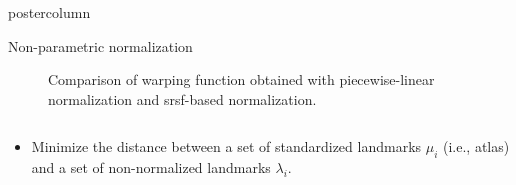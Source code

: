 \documentclass[final, size=a0]{beamer}
\begin{document}
\begin{frame}
\begin{columns}
\begin{column}{.33\textwidth}
\begin{beamercolorbox}[center,wd=\textwidth]{postercolumn}
\begin{minipage}[T]{.95\textwidth}
{\begin{alertblock}{Non-parametric normalization}
              \begin{figure}
                \centering
                \hfill
                \hfill
                \caption{Comparison of warping function obtained with \protect{} piecewise-linear normalization and \protect{} \acs{srsf}-based normalization.}
                \label{fig:non-parametric}
              \end{figure}
              
              \begin{columns}
                \begin{column}{.5\textwidth}
                  \begin{itemize}
                  \justifying
                  \item Minimize the distance between a set of standardized landmarks $\mu_i$ (i.e., atlas) and a set of non-normalized landmarks $\lambda_i$.
                  \end{itemize}

                  \vspace{.1cm}


\end{column}
\end{columns}
\end{alertblock}}
\end{minipage}
\end{beamercolorbox}
\end{column}
\end{columns}
\end{frame}
\end{document}
